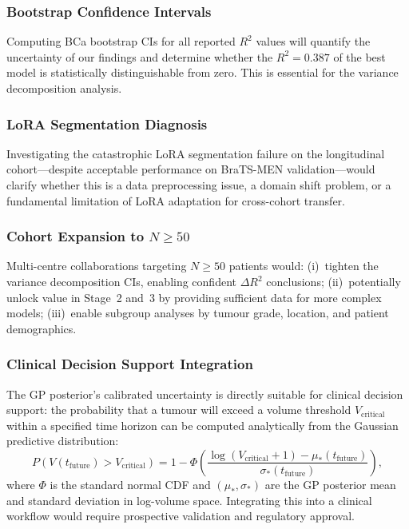 \subsubsection{Bootstrap Confidence Intervals}

Computing BCa bootstrap CIs for all reported $R^2$ values will quantify the
uncertainty of our findings and determine whether the $R^2 = 0.387$ of the
best model is statistically distinguishable from zero. This is essential for
the variance decomposition analysis.

\subsubsection{LoRA Segmentation Diagnosis}

Investigating the catastrophic LoRA segmentation failure on the longitudinal
cohort---despite acceptable performance on BraTS-MEN validation---would
clarify whether this is a data preprocessing issue, a domain shift problem,
or a fundamental limitation of LoRA adaptation for cross-cohort transfer.

\subsubsection{Cohort Expansion to $N \geq 50$}

Multi-centre collaborations targeting $N \geq 50$ patients would: (i)~tighten
the variance decomposition CIs, enabling confident $\Delta R^2$ conclusions;
(ii)~potentially unlock value in Stage~2 and~3 by providing sufficient data
for more complex models; (iii)~enable subgroup analyses by tumour grade,
location, and patient demographics.

\subsubsection{Clinical Decision Support Integration}

The GP posterior's calibrated uncertainty is directly suitable for clinical
decision support: the probability that a tumour will exceed a volume
threshold $V_{\text{critical}}$ within a specified time horizon can be
computed analytically from the Gaussian predictive distribution:
\begin{equation}
  P(V(t_{\text{future}}) > V_{\text{critical}}) =
    1 - \Phi\!\left(\frac{\log(V_{\text{critical}} + 1) - \mu_*(t_{\text{future}})}
    {\sigma_*(t_{\text{future}})}\right),
  \label{eq:clinical_decision}
\end{equation}
where $\Phi$ is the standard normal CDF and $(\mu_*, \sigma_*)$ are the GP
posterior mean and standard deviation in log-volume space. Integrating this
into a clinical workflow would require prospective validation and regulatory
approval.

